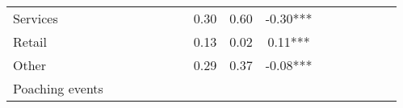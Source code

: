 {\begin{tabular}{l*{5}{ccc}}
Services            &            &            &            &            &            &            &        0.30&        0.60&       -0.30***\\
Retail              &            &            &            &            &            &            &        0.13&        0.02&        0.11***\\
Other               &            &            &            &            &            &            &        0.29&        0.37&       -0.08***\\
\midrule
Poaching events     &            &            &            &            &            &            &            &            &               \\
\bottomrule
\end{tabular}
}
